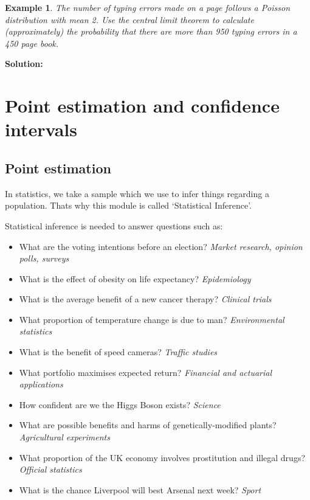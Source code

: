 \documentclass[12pt]{article}
\theoremstyle{break}
\newtheorem{example}[theorem]{Example}
\begin{document}
\begin{example}
The number of typing errors made on a page follows a Poisson distribution with mean 2. Use the central limit theorem to calculate (approximately) the probability that there are more than 950 typing errors in a 450 page book.
\end{example}
\begin{mdframed}
{\bf Solution:}
\textcolor[rgb]{1.00,1.00,1.00}{\lipsum[1-2]}
\end{mdframed}

\newpage
\section{Point estimation and confidence intervals}
\subsection{Point estimation}
In statistics, we take a sample which we use to infer things regarding a population. Thats why this module is called `Statistical Inference'.

Statistical inference is needed to answer questions such as:
\begin{itemize}
\item What are the voting intentions before an election? \emph{Market research, opinion
polls, surveys}
\item What is the effect of obesity on life expectancy? \emph{Epidemiology}
\item What is the average benefit of a new cancer therapy? \emph{Clinical trials}
\item What proportion of temperature change is due to man? \emph{Environmental
statistics}
\item What is the benefit of speed cameras? \emph{Traffic studies}
\item What portfolio maximises expected return? \emph{Financial and actuarial
applications}
\item How confident are we the Higgs Boson exists? \emph{Science}
\item What are possible benefits and harms of genetically-modified plants?
\emph{Agricultural experiments}
\item What proportion of the UK economy involves prostitution and illegal drugs?
\emph{Official statistics}
\item What is the chance Liverpool will best Arsenal next week? \emph{Sport}
\end{itemize}
\end{document}
